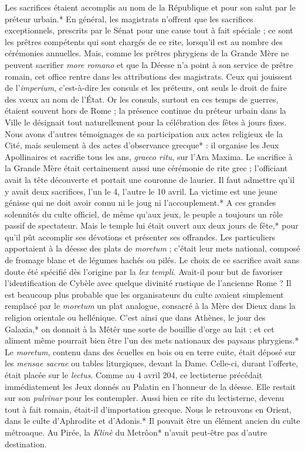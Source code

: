 \documentclass[a4paper, 11pt, oneside, polutonikogreek, french]{article}
\begin{document}
Les sacrifices étaient accomplis au nom de la République et pour son salut par le préteur urbain.* En général, les magistrats n'offrent que les sacrifices exceptionnels, prescrits par le Sénat pour une cause tout à fait spéciale ; ce sont les prêtres compétents qui sont chargés de ce rite, lorsqu'il est au nombre des cérémonies annuelles. Mais, comme les prêtres phrygiens de la Grande Mère ne peuvent sacrifier \emph{more romano} et que la Déesse n'a point à son service de prêtre romain, cet office rentre dans les attributions des magistrats. Ceux qui jouissent de l'\emph{imperium}, c'est-à-dire les consuls et les préteurs, ont seuls le droit de faire des vœux au nom de l'État. Or les consuls, surtout en ces temps de guerres, étaient souvent hors de Rome ; la présence continue du préteur urbain dans la Ville le désignait tout naturellement pour la célébration des fêtes à jours fixes. Nous avons d'autres témoignages de sa participation aux actes religieux de la Cité, mais seulement à des actes d'observance grecque* : il organise les Jeux Apollinaires et sacrifie tous les ans, \emph{graeco ritu}, sur l'Ara Maxima. Le sacrifice à la Grande Mère était certainement aussi une cérémonie de rite grec ; l'officiant avait la tête découverte et portait une couronne de laurier. Il faut admettre qu'il y avait deux sacrifices, l'un le 4, l'autre le 10 avril. La victime est une jeune génisse qui ne doit avoir connu ni le joug ni l'accouplement.* A ces grandes solennités du culte officiel, de même qu'aux jeux, le peuple a toujours un rôle passif de spectateur. Mais le temple lui était ouvert aux deux jours de fête,* pour qu'il pût accomplir ses dévotions et présenter ses offrandes. Les particuliers apportaient à la déesse des plats de \emph{moretum} ; c'était leur mets national, composé de fromage blanc et de légumes hachés ou pilés. Le choix de ce sacrifice avait sans doute été spécifié dès l'origine par la \emph{lex templi}. Avait-il pour but de favoriser l'identification de Cybèle avec quelque divinité rustique de l'ancienne Rome ? Il est beaucoup plus probable que les organisateurs du culte avaient simplement remplacé par le \emph{moretum} un plat analogue, consacré à la Mère des Dieux dans la religion orientale ou hellénique. C'est ainsi que dans Athènes, le jour des Galaxia,* on donnait à la Mêtêr une sorte de bouillie d'orge au lait ; et cet aliment même pourrait bien être l'un des mets nationaux des paysans phrygiens.* Le \emph{moretum}, contenu dans des écuelles en bois ou en terre cuite, était déposé sur les \emph{mensae sacrae} ou tables liturgiques, devant la Dame. Celle-ci, durant l'offerte, était placée sur le \emph{lectus}. Comme au 4 avril 204, ce lectisterne précédait immédiatement les Jeux donnés au Palatin en l'honneur de la déesse. Elle restait sur son \emph{pulvinar} pour les contempler. Aussi bien ce rite du lectisterne, devenu tout à fait romain, était-il d'importation grecque. Nous le retrouvons en Orient, dans le culte d'Aphrodite et d'Adonis.* Il pouvait être un élément ancien du culte métroaque. Au Pirée, la \emph{Klinè} du Metrôon* n'avait peut-être pas d'autre destination.
\end{document}
